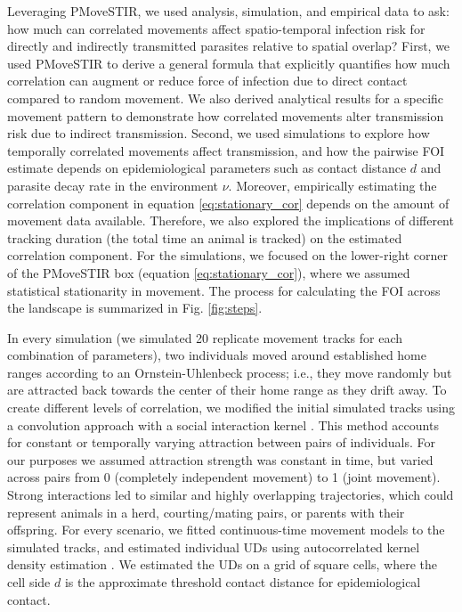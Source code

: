 \documentclass[letterpaper]{article}
\begin{document}
Leveraging PMoveSTIR, we used analysis, simulation, and empirical data to ask: how much can correlated movements affect spatio-temporal infection risk for directly and indirectly transmitted parasites relative to spatial overlap? 
First, we used PMoveSTIR to derive a general formula that explicitly quantifies how much correlation can augment or reduce force of infection due to direct contact compared to random movement. We also derived analytical results for a specific movement pattern to demonstrate how correlated movements alter transmission risk due to indirect transmission.
Second, we used simulations to explore how temporally correlated movements affect  transmission, and how the pairwise FOI estimate depends on epidemiological parameters such as contact distance $d$ and parasite decay rate in the environment $\nu$. Moreover, empirically estimating the correlation component in equation \ref{eq:stationary_cor} depends on the amount of movement data available. Therefore, we also explored the implications of different tracking duration (the total time an animal is tracked) on the estimated correlation component. For the simulations, we focused on the lower-right corner of the PMoveSTIR box (equation \ref{eq:stationary_cor}), where we assumed statistical stationarity in movement. The process for calculating the FOI across the landscape is summarized in Fig. \ref{fig:steps}.

In every simulation (we simulated 20 replicate movement tracks for each combination of parameters), two individuals moved around established home ranges according to an Ornstein-Uhlenbeck process; i.e., they move randomly but are attracted back towards the center of their home range as they drift away. To create different levels of correlation, we modified the initial simulated tracks using a convolution approach with a social interaction kernel \citep{Scharf2018}. This method accounts for constant or temporally varying attraction between pairs of individuals. For our purposes we assumed attraction strength was constant in time, but varied across pairs from 0 (completely independent movement) to 1 (joint movement). Strong interactions led to similar and highly overlapping trajectories, which could represent animals in a herd, courting/mating pairs, or parents with their offspring.
For every scenario, we fitted continuous-time movement models to the simulated tracks, and estimated individual UDs using autocorrelated kernel density estimation \citep{Calabrese2016}. We estimated the UDs on a grid of square cells, where the cell side $d$ is the approximate threshold contact distance for epidemiological contact. 
\end{document}
